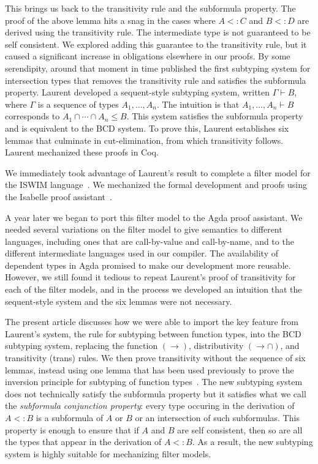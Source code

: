\documentclass{article}
\begin{document}
This brings us back to the transitivity rule and the subformula
property. The proof of the above lemma hits a snag in the cases where
$A <: C$ and $B <: D$ are derived using the transitivity rule. The
intermediate type is not guaranteed to be self consistent. We explored
adding this guarantee to the transitivity rule, but it caused a
significant increase in obligations elsewhere in our proofs. By some
serendipity, around that moment in time \citet{Laurent:2018aa}
published the first subtyping system for intersection types that
removes the transitivity rule and satisfies the subformula property.
Laurent developed a sequent-style subtyping system, written $\Gamma
\vdash B$, where $\Gamma$ is a sequence of types $A_1,\ldots,A_n$. The
intuition is that $A_1,\ldots,A_n \vdash B$ corresponds to $A_1 \cap
\cdots \cap A_n \leq B$. This system satisfies the subformula property
and is equivalent to the BCD system. To prove this, Laurent
establishes six lemmas that culminate in cut-elimination, from which
transitivity follows. Laurent mechanized these proofs in Coq.

We immediately took advantage of Laurent's result to complete a filter
model for the ISWIM
language~\citep{Landin:1966la,G.-D.-Plotkin:1975on,Felleisen:2009aa}.
We mechanized the formal development and proofs using the Isabelle
proof assistant~\citep{Siek:2018aa}.

A year later we began to port this filter model to the Agda proof
assistant. We needed several variations on the filter model to give
semantics to different languages, including ones that are
call-by-value and call-by-name, and to the different intermediate
languages used in our compiler.  The availability of dependent types
in Agda promised to make our development more reusable.  However, we
still found it tedious to repeat Laurent's proof of transitivity for
each of the filter models, and in the process we developed an
intuition that the sequent-style system and the six lemmas were not
necessary.

The present article discusses how we were able to import the key
feature from Laurent's system, the rule for subtyping between function
types, into the BCD subtyping system, replacing the function $(\to)$,
distributivity $({\to}{\cap})$, and transitivity (trans) rules.  We
then prove transitivity without the sequence of six lemmas, instead
using one lemma that has been used previously to prove the inversion
principle for subtyping of function
types~\citep{Barendregt:2013aa}. The new subtyping system does not
technically satisfy the subformula property but it satisfies what we
call the \emph{subformula conjunction property}: every type occuring
in the derivation of $A <: B$ is a subformula of $A$ or $B$ or an
intersection of such subformulas.  This property is enough to ensure
that if $A$ and $B$ are self consistent, then so are all the types
that appear in the derivation of $A <: B$. As a result, the new
subtyping system is highly suitable for mechanizing filter models.
\end{document}
